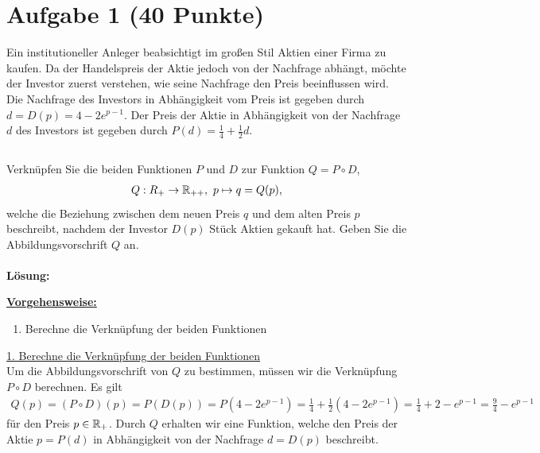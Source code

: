 \vspace{1cm}
\renewcommand{\labelenumi}{\theenumi.}
\section*{Aufgabe 1 (40 Punkte)}
\vspace{0.4cm}
Ein institutioneller Anleger beabsichtigt im großen Stil Aktien einer Firma zu kaufen.
Da der Handelspreis der Aktie jedoch von der Nachfrage abhängt, möchte der Investor zuerst verstehen, wie seine Nachfrage den Preis beeinflussen wird.
Die Nachfrage des Investors in Abhängigkeit vom Preis ist gegeben durch $ d = D(p) =4 - 2 e^{p-1}$.
Der Preis der Aktie in Abhängigkeit von der Nachfrage $ d $ des Investors ist gegeben durch $ P(d) = \frac{1}{4} + \frac{1}{2} d $.
\subsection*{}
Verknüpfen Sie die beiden Funktionen $ P $ und $ D $ zur Funktion $ Q = P \circ D $,
\begin{align*}
	Q : R_+ \to \mathbb{R}_{++} , \ p \mapsto q= Q(p),
\end{align*}
welche die Beziehung zwischen dem neuen Preis $ q $ und dem alten Preis $ p $ beschreibt,
nachdem der Investor $ D(p) $ Stück Aktien gekauft hat.
Geben Sie die Abbildungsvorschrift $ Q $ an.
\\
\\
\textbf{Lösung:}
\begin{mdframed}
\underline{\textbf{Vorgehensweise:}}
\renewcommand{\labelenumi}{\theenumi.}
\begin{enumerate}
\item Berechne die Verknüpfung der beiden Funktionen

\end{enumerate}
\end{mdframed}
\underline{1. Berechne die Verknüpfung der beiden Funktionen}\\
Um die Abbildungsvorschrift von $ Q $ zu bestimmen, müssen wir die Verknüpfung $ P \circ D $ berechnen.
Es gilt
\begin{align*}
	Q(p) = (P \circ D)(p)
	=
	P(D(p))
	=
	P(4 - 2e^{p-1})
	=
	\frac{1}{4} + \frac{1}{2}(4 - 2e^{p-1})
	=
	\frac{1}{4} + 2 -e^{p-1}
	=
	\frac{9}{4} - e^{p-1}
\end{align*}
für den Preis $ p \in \mathbb{R}_+ $.
Durch $ Q $ erhalten wir eine Funktion, welche den Preis der Aktie $ p = P(d) $ in Abhängigkeit von der Nachfrage $ d = D(p) $ beschreibt.
 


